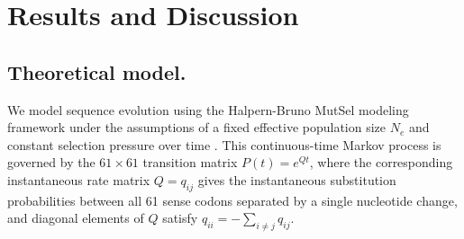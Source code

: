 \documentclass[11pt]{article}
\begin{document}
		
\section*{Results and Discussion}
		
		
\subsection*{Theoretical model.}

We model sequence evolution using the Halpern-Bruno MutSel modeling framework under the assumptions of a fixed effective population size $N_e$ and constant selection pressure over time \cite{HalpernBruno1998,YangNielsen2008,Tamurietal2012,Thorne2012}. This continuous-time Markov process is governed by the $61 \times 61$ transition matrix $P(t) = e^{Qt}$, where the corresponding instantaneous rate matrix $Q = q_{ij}$ gives the instantaneous substitution probabilities between all 61 sense codons separated by a single nucleotide change, and diagonal elements of $Q$ satisfy $q_{ii} = -\sum_{i \neq j} q_{ij}$.
\end{document}
